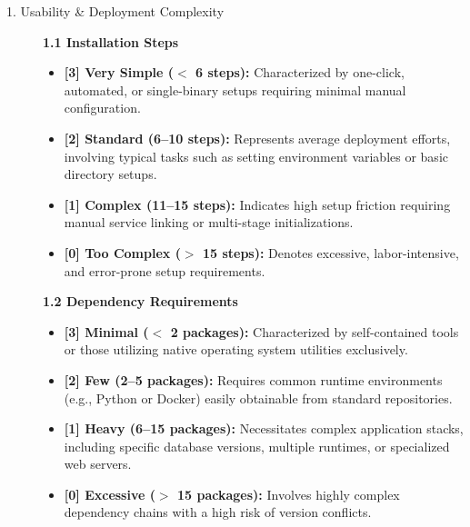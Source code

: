 \begin{description}
    \item[1. Usability \& Deployment Complexity] \hfill \par
    \textbf{1.1 Installation Steps}
    \begin{itemize}
        \item \textbf{[3] Very Simple ($<$ 6 steps):} Characterized by one-click, automated, or single-binary setups requiring minimal manual configuration.
        \item \textbf{[2] Standard (6--10 steps):} Represents average deployment efforts, involving typical tasks such as setting environment variables or basic directory setups.
        \item \textbf{[1] Complex (11--15 steps):} Indicates high setup friction requiring manual service linking or multi-stage initializations.
        \item \textbf{[0] Too Complex ($>$ 15 steps):} Denotes excessive, labor-intensive, and error-prone setup requirements.
    \end{itemize}
    \textbf{1.2 Dependency Requirements}
    \begin{itemize}
        \item \textbf{[3] Minimal ($<$ 2 packages):} Characterized by self-contained tools or those utilizing native operating system utilities exclusively.
        \item \textbf{[2] Few (2--5 packages):} Requires common runtime environments (e.g., Python or Docker) easily obtainable from standard repositories.
        \item \textbf{[1] Heavy (6--15 packages):} Necessitates complex application stacks, including specific database versions, multiple runtimes, or specialized web servers.
        \item \textbf{[0] Excessive ($>$ 15 packages):} Involves highly complex dependency chains with a high risk of version conflicts.
    \end{itemize}


\end{description}
